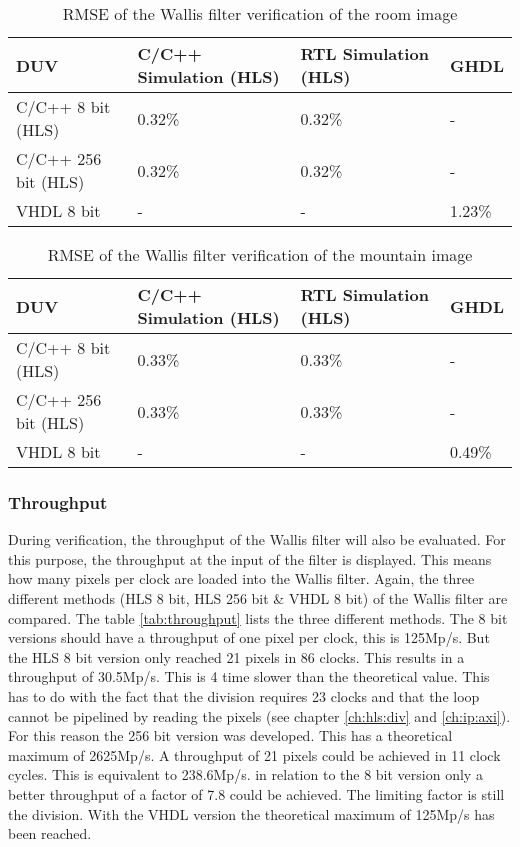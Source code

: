 \begin{table}[tb!]
    \centering
    \begin{tabular}{l l l l}
        \toprule
        DUV & C/C++ Simulation (HLS) & RTL Simulation (HLS) & GHDL \\
        \midrule
        C/C++ 8 bit (HLS) & 0.32\% & 0.32\% & -\\
        C/C++ 256 bit (HLS) & 0.32\% & 0.32\% & - \\
        VHDL 8 bit & - & - & 1.23\% \\
        \bottomrule
    \end{tabular}
    \caption{RMSE of the Wallis filter verification of the room image}
    \label{tab:rmse_room}
\end{table}

\begin{table}[tb!]
    \centering
    \begin{tabular}{l l l l}
        \toprule
        DUV & C/C++ Simulation (HLS) & RTL Simulation (HLS) & GHDL \\
        \midrule
        C/C++ 8 bit (HLS) & 0.33\% & 0.33\% & - \\
        C/C++ 256 bit (HLS) & 0.33\% & 0.33\% & - \\
        VHDL 8 bit & - & - & 0.49\% \\
        \bottomrule
    \end{tabular}
    \caption{RMSE of the Wallis filter verification of the mountain image}
    \label{tab:rmse_mountain}
\end{table}



\subsubsection*{Throughput}
During verification, the throughput of the Wallis filter will also be evaluated. For this purpose, the throughput at the input of the filter is displayed. This means how many pixels per clock are loaded into the Wallis filter. Again, the three different methods (HLS 8 bit, HLS 256 bit \& VHDL 8 bit) of the Wallis filter are compared. The table \ref{tab:throughput} lists the three different methods. The 8 bit versions should have a throughput of one pixel per clock, this is 125Mp/s. But the HLS 8 bit version only reached 21 pixels in 86 clocks. This results in a throughput of 30.5Mp/s. This is 4 time slower than the theoretical value. This has to do with the fact that the division requires 23 clocks and that the loop cannot be pipelined by reading the pixels (see chapter \ref{ch:hls:div} and \ref{ch:ip:axi}). For this reason the 256 bit version was developed. This has a theoretical maximum of 2625Mp/s. A throughput of 21 pixels could be achieved in 11 clock cycles. This is equivalent to 238.6Mp/s. in relation to the 8 bit version only a better throughput of a factor of 7.8 could be achieved. The limiting factor is still the division. With the VHDL version the theoretical maximum of 125Mp/s has been reached.

